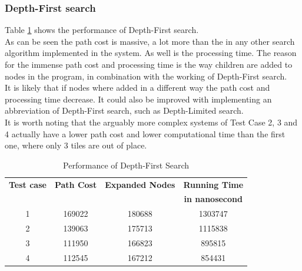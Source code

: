 \documentclass[journal]{IEEEtran}
\begin{document}
\subsubsection{Depth-First search}
Table \ref{tab:dfs} shows the performance of Depth-First search.\\
As can be seen the path cost is massive, a lot more than the in any other search algorithm implemented in the system. As well is the processing time. The reason for the immense path cost and processing time is the way children are added to nodes in the program, in combination with the working of Depth-First search. \\
It is likely that if nodes where added in a different way the path cost and processing time decrease. It could also be improved with implementing an abbreviation of Depth-First search, such as Depth-Limited search. \\
It is worth noting that the arguably more complex systems of Test Case 2, 3 and 4 actually have a lower path cost and lower computational time than the first one, where only 3 tiles are out of place. 
\begin{table}[h]
\renewcommand{\arraystretch}{1.3}
\centering
\caption{Performance of Depth-First Search}
\begin{tabular}{|c|c|c|c|}
\hline
\bfseries Test case &\bfseries Path Cost & \bfseries Expanded Nodes & \bfseries Running Time \\\
 & & &\bfseries in nanosecond\\\hline
1 & 169022 & 180688 & 1303747 \\
2 & 139063 & 175713 & 1115838 \\
3 & 111950 & 166823 & 895815 \\
4 & 112545 & 167212 & 854431 \\\hline
\end{tabular}
\label{tab:dfs}
\end{table}
\end{document}
